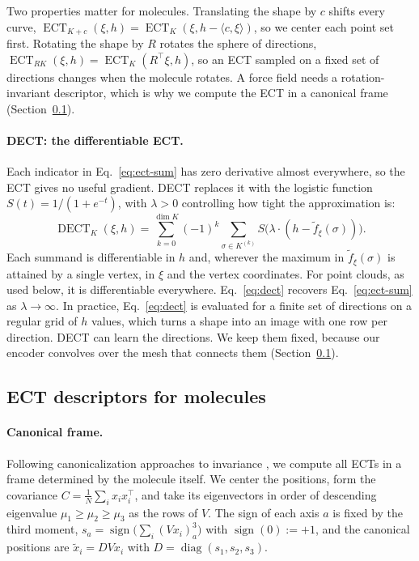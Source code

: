 \documentclass{article}
\newcommand{\ECT}{\operatorname{ECT}}
\newcommand{\DECT}{\operatorname{DECT}}
\begin{document}
Two properties matter for molecules. Translating the shape by $c$ shifts every curve, $\ECT_{K+c}(\xi,h) = \ECT_K(\xi, h - \langle c,\xi\rangle)$, so we center each point set first. Rotating the shape by $R$ rotates the sphere of directions, $\ECT_{RK}(\xi,h) = \ECT_K(R^\top\xi, h)$, so an ECT sampled on a fixed set of directions changes when the molecule rotates. A force field needs a rotation-invariant descriptor, which is why we compute the ECT in a canonical frame (Section~\ref{sec:ect-molecules}).

\paragraph{DECT: the differentiable ECT.}
Each indicator in Eq.~\eqref{eq:ect-sum} has zero derivative almost everywhere, so the ECT gives no useful gradient. DECT \citep{roell2024dect} replaces it with the logistic function $S(t) = 1/(1+e^{-t})$, with $\lambda>0$ controlling how tight the approximation is:
\begin{equation}
  \DECT_K(\xi,h) = \sum_{k=0}^{\dim K} (-1)^k \sum_{\sigma\in K^{(k)}} S\big(\lambda\cdot(h - \tilde f_\xi(\sigma))\big).
  \label{eq:dect}
\end{equation}
Each summand is differentiable in $h$ and, wherever the maximum in $\tilde f_\xi(\sigma)$ is attained by a single vertex, in $\xi$ and the vertex coordinates. For point clouds, as used below, it is differentiable everywhere. Eq.~\eqref{eq:dect} recovers Eq.~\eqref{eq:ect-sum} as $\lambda\to\infty$. In practice, Eq.~\eqref{eq:dect} is evaluated for a finite set of directions on a regular grid of $h$ values, which turns a shape into an image with one row per direction. DECT can learn the directions. We keep them fixed, because our encoder convolves over the mesh that connects them (Section~\ref{sec:ect-molecules}).

\subsection{ECT descriptors for molecules}
\label{sec:ect-molecules}

\paragraph{Canonical frame.}
Following canonicalization approaches to invariance \citep{puny2022frame,kaba2023canonicalization}, we compute all ECTs in a frame determined by the molecule itself. We center the positions, form the covariance $C = \frac{1}{N}\sum_i x_i x_i^\top$, and take its eigenvectors in order of descending eigenvalue $\mu_1\ge\mu_2\ge\mu_3$ as the rows of $V$. The sign of each axis $a$ is fixed by the third moment, $s_a = \operatorname{sign}\big(\sum_i (Vx_i)_a^3\big)$ with $\operatorname{sign}(0) := +1$, and the canonical positions are $\tilde x_i = DVx_i$ with $D = \operatorname{diag}(s_1,s_2,s_3)$.
\end{document}
